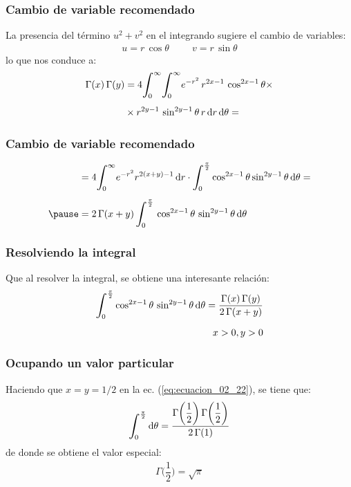 \documentclass[12pt]{beamer}
\begin{document}
\begin{frame}
\frametitle{Cambio de variable recomendado}
La presencia del término $u^{2} + v^{2}$ en el integrando sugiere el cambio de variables:
\pause
\begin{align*}
u = r \, \cos \theta \hspace{1cm} v = r \, \sin \theta
\end{align*}
\pause
lo que nos conduce a:
\begin{align*}
\Gamma (x) \, \Gamma (y) &= 4 \scaleint{6ex}_{\bs 0}^{\infty} \scaleint{6ex}_{\bs 0}^{\infty} e^{-r^{2}} \, r^{2x-1} \, \cos^{2x-1} \theta \times \\[0.5em]
&\times r^{2y-1} \, \sin^{2y-1} \theta \, r \dd{r} \dd{\theta} =
\end{align*}
\end{frame}
\begin{frame}
\frametitle{Cambio de variable recomendado}
\begin{eqnarray*}
\begin{aligned}
&= 4 \scaleint{6ex}_{\bs 0}^{\infty} e^{-r^{2}} r^{2(x+y)-1} \dd{r} \cdot \scaleint{6ex}_{\bs 0}^{\frac{\pi}{2}} \cos^{2x-1} \theta \sin^{2y-1} \theta \dd{\theta} = \\[0.5em] \pause
&= 2 \, \Gamma(x + y) \, \scaleint{6ex}_{\bs 0}^{\frac{\pi}{2}} \, \cos^{2x-1} \theta \, \sin^{2y-1} \theta \dd{\theta}
\end{aligned}
\end{eqnarray*}
\end{frame}
\begin{frame}
\frametitle{Resolviendo la integral}
Que al resolver la integral, se obtiene una interesante relación:
\pause
\begin{align}
\begin{aligned}
\scaleint{6ex}_{\bs 0}^{\frac{\pi}{2}} \cos^{2x-1} \theta \, \sin^{2y-1} \theta \dd{\theta} = \dfrac{\Gamma (x) \, \Gamma(y)}{2 \, \Gamma(x + y)} \\[0.5em]
x > 0, y > 0
\end{aligned}
\label{eq:ecuacion_02_22}
\end{align}
\end{frame}
\begin{frame}
\frametitle{Ocupando un valor particular}
Haciendo que $x =  y = 1/2$ en la ec. (\ref{eq:ecuacion_02_22}), se tiene que:
\pause
\begin{align*}
\scaleint{6ex}_{\bs 0}^{\frac{\pi}{2}} \dd{\theta} = \dfrac{\Gamma \bigg( \dfrac{1}{2} \bigg) \, \Gamma \bigg( \dfrac{1}{2} \bigg)}{2 \, \Gamma (1)}
\end{align*}
\pause
de donde se obtiene el valor especial:
\pause
\begin{align}
\Gamma \bigg( \dfrac{1}{2} \bigg) = \sqrt{\pi}
\label{eq:ecuacion_02_23}
\end{align}
\end{frame}
\end{document}
